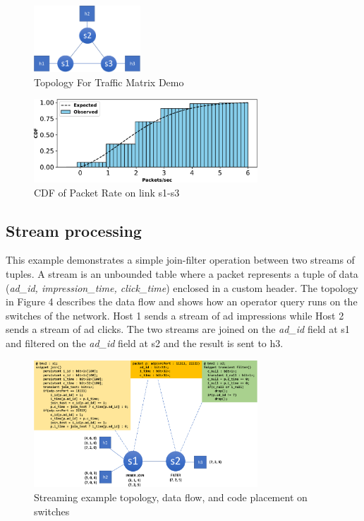 \begin{figure}[tp]
\centering
\includegraphics[width=40mm,scale=0.7]{figures/traf_mat_topo}
\caption{Topology For Traffic Matrix Demo}
\label{fig:tm}
\vspace{-0.2in}
\end{figure}


\begin{figure}[tp]
\centering
\includegraphics[width=84mm,scale=0.7]{figures/exp_obs_cdf}
\vspace{-0.15in}
\caption{CDF of Packet Rate on link s1-s3}
\end{figure}

\vspace{-0.1in}
\subsection{Stream processing}
 \vspace{-1mm}

This example demonstrates a simple join-filter operation between two streams of
tuples. A stream is an unbounded table where a packet represents a tuple of
data (\textit{ad\_id, impression\_time, click\_time}) enclosed in a custom
header. The topology in Figure 4 describes the data flow and shows how an
operator query runs on the switches of the network. Host 1 sends a stream of ad
impressions while Host 2 sends a stream of ad clicks. The two streams are
joined on the \textit{ad\_id} field at s1 and filtered on the \textit{ad\_id}
field at s2 and the result is sent to h3. 

\begin{figure}[tp]
\centering
\includegraphics[width=84mm]{figures/streaming_example}
\caption{Streaming example topology, data flow, and code placement on switches}
\vspace{-5mm}
\end{figure}
\vspace{-3mm}


